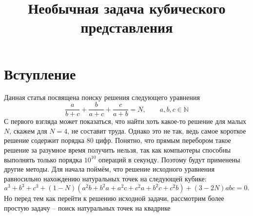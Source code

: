 \title{Необычная задача кубического представления}  
\date{}  
\author{}


\maketitle  
\section*{Вступление}

Данная статья посвящена поиску решения следующего уравнения
\[
\frac{a} {b + c}  + \frac{b}{a + c} + \frac{c}{a + b} = N, \qquad a, b, c \in
\mathbb{N}
\] 
С первого взгляда может показаться, что найти хоть какое-то решение для малых
\(N\), скажем для \(N = 4\), не составит труда. Однако это не так, ведь самое
короткое решение содержит порядка 80 цифр. Понятно, что прямым перебором такое
решение за разумное время получить нельзя, так как компьютеры способны
выполнять только порядка \(10^{10}\) операций в секунду. Поэтому будут применены 
другие методы. Для начала поймём, что решение исходного уравнения равносильно
нахождению натуральных точек на следующей кубике:
\[
    a^3 + b^3 + c^3 + (1 - N) (a^2 b + b^2 a + a^2 c + c^2 a + b^2 c + c^2 b)
    + (3 - 2 N) a b c = 0
.\] 
Но перед тем как перейти к решению исходной задачи, рассмотрим более простую
задачу -- поиск натуральных точек на квадрике 

